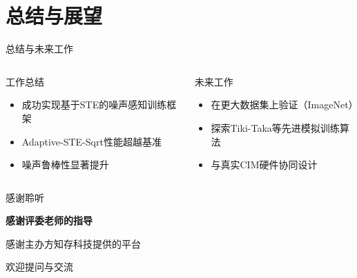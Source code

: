\documentclass[aspectratio=169]{beamer}
\begin{document}
\section{总结与展望}
\begin{frame}{总结与未来工作}
\begin{columns}
\begin{block}{工作总结}
\begin{itemize}
\item 成功实现基于STE的噪声感知训练框架
\item Adaptive-STE-Sqrt性能超越基准
\item 噪声鲁棒性显著提升
\end{itemize}
\end{block}
\begin{block}{未来工作}
\begin{itemize}
\item 在更大数据集上验证（ImageNet）
\item 探索Tiki-Taka等先进模拟训练算法
\item 与真实CIM硬件协同设计
\end{itemize}
\end{block}
\end{columns}
\end{frame}

\begin{frame}{感谢聆听}
\vfill
\begin{center}
\Large\textbf{感谢评委老师的指导}
\end{center}
\vfill
\begin{center}
感谢主办方知存科技提供的平台
\end{center}
\vfill
\begin{center}
\Large{欢迎提问与交流}
\end{center}
\end{frame}
\end{document}
